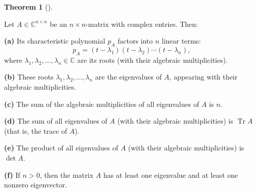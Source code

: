 \documentclass[numbers=enddot,12pt,final,onecolumn,notitlepage]{scrartcl}%
\numberwithin{exer}{subsection}
\theoremstyle{definition}
\newtheorem{theo}{Theorem}[subsection]
\newenvironment{theorem}[1][]
{\begin{theo}[#1]\begin{leftbar}}
{\end{leftbar}\end{theo}}
\begin{document}
\begin{theorem}
\label{thm.schurtri.ch.fta-cons}Let $A\in\mathbb{C}^{n\times n}$ be an
$n\times n$-matrix with complex entries. Then: \medskip

\textbf{(a)} Its characteristic polynomial $p_{A}$ factors into $n$ linear
terms:%
\begin{equation}
p_{A}=\left(  t-\lambda_{1}\right)  \left(  t-\lambda_{2}\right)
\cdots\left(  t-\lambda_{n}\right)  , \label{eq.schurtri.ch.pA-factors}%
\end{equation}
where $\lambda_{1},\lambda_{2},\ldots,\lambda_{n}\in\mathbb{C}$ are its roots
(with their algebraic multiplicities). \medskip

\textbf{(b)} These roots $\lambda_{1},\lambda_{2},\ldots,\lambda_{n}$ are the
eigenvalues of $A$, appearing with their algebraic multiplicities. \medskip

\textbf{(c)} The sum of the algebraic multiplicities of all eigenvalues of $A$
is $n$. \medskip

\textbf{(d)} The sum of all eigenvalues of $A$ (with their algebraic
multiplicities) is $\operatorname*{Tr}A$ (that is, the trace of $A$). \medskip

\textbf{(e)} The product of all eigenvalues of $A$ (with their algebraic
multiplicities) is $\det A$. \medskip

\textbf{(f)} If $n>0$, then the matrix $A$ has at least one eigenvalue and at
least one nonzero eigenvector.
\end{theorem}
\end{document}
